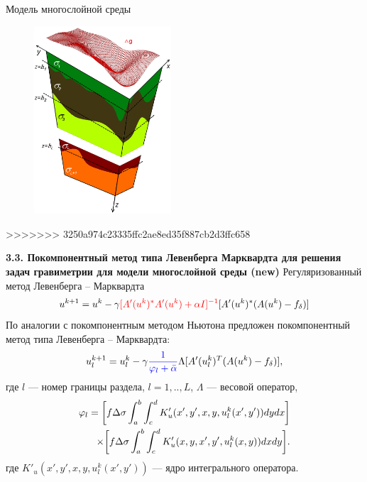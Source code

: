 \documentclass[10pt,pdf, mathserif, hyperref={unicode}]{beamer}
\begin{document}
\begin{frame}{Модель многослойной среды}
	\begin{figure}[h]
		\centering
		\includegraphics[height=7.0cm]{whitegrav.png}
		\label{fig:multlayer}
	\end{figure}
	\centering
>>>>>>> 3250a974c23335ffc2ae8ed35f887cb2d3ffc658
\end{frame}
\begin{frame}{\small\textbf{3.3. Покомпонентный метод типа Левенберга Марквардта для решения задач гравиметрии для модели многослойной среды \textbf{(new)}}}
	Регуляризованный метод Левенберга -- Марквардта %
	$$	u^{k+1}=u^k-\gamma{\color{red}[A'(u^k)^*A'(u^k)+\alpha I]^{-1} }[A'(u^k)^*(A(u^k)-f_\delta)]$$
	По аналогии с покомпонентным методом Ньютона предложен покомпонентный метод типа Левенберга -- Марквардта:
	$$ u_l^{k+1}=u_l^k-\gamma{\color{blue}\frac{1}{\varphi_l+\bar{\alpha}}}\Lambda[ A'(u_l^k)^T(A(u^k)-f_\delta)],$$
	где $l$ --- номер границы раздела, $l=1,..,L$, $\Lambda$ --- весовой оператор, 
	\begin{equation*}
	\begin{aligned}
	\varphi_l=\bigg[ f\Delta\sigma\int_{a}^{b}\int_{c}^{d}
	K'_u(x',y', x, y, u_l^k(x',y'))dydx\bigg] \notag \\ \times\bigg[f\Delta\sigma\int_{a}^{b}\int_{c}^{d}K'_u(x,y, x',y',u_l^k(x,y))dxdy\bigg]. 
	\end{aligned}
	\end{equation*} 
	где $K'_u(x',y', x, y, u_l^k(x',y'))$ --- ядро интегрального оператора. %
	\let\thefootnote\relax\let\thefootnote\relax{}

\end{frame}
\end{document}

